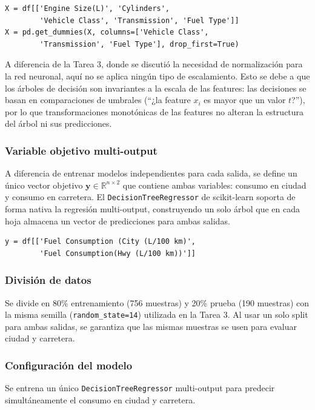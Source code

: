 \documentclass{article}
\begin{document}
\begin{lstlisting}
X = df[['Engine Size(L)', 'Cylinders', 
        'Vehicle Class', 'Transmission', 'Fuel Type']]
X = pd.get_dummies(X, columns=['Vehicle Class', 
        'Transmission', 'Fuel Type'], drop_first=True)
\end{lstlisting}

A diferencia de la Tarea 3, donde se discutió la necesidad de normalización para la red neuronal, aquí no se aplica ningún tipo de escalamiento. Esto se debe a que los árboles de decisión son invariantes a la escala de las features: las decisiones se basan en comparaciones de umbrales (``¿la feature $x_i$ es mayor que un valor $t$?''), por lo que transformaciones monotónicas de las features no alteran la estructura del árbol ni sus predicciones.

\subsubsection{Variable objetivo multi-output}

A diferencia de entrenar modelos independientes para cada salida, se define un único vector objetivo $\mathbf{y} \in \mathbb{R}^{n \times 2}$ que contiene ambas variables: consumo en ciudad y consumo en carretera. El \texttt{DecisionTreeRegressor} de scikit-learn soporta de forma nativa la regresión multi-output, construyendo un solo árbol que en cada hoja almacena un vector de predicciones para ambas salidas.

\begin{lstlisting}
y = df[['Fuel Consumption (City (L/100 km)',
        'Fuel Consumption(Hwy (L/100 km))']]
\end{lstlisting}

\subsubsection{División de datos}

Se divide en 80\% entrenamiento (756 muestras) y 20\% prueba (190 muestras) con la misma semilla (\texttt{random\_state=14}) utilizada en la Tarea 3. Al usar un solo split para ambas salidas, se garantiza que las mismas muestras se usen para evaluar ciudad y carretera.

\subsubsection{Configuración del modelo}

Se entrena un único \texttt{DecisionTreeRegressor} multi-output para predecir simultáneamente el consumo en ciudad y carretera.
\end{document}
